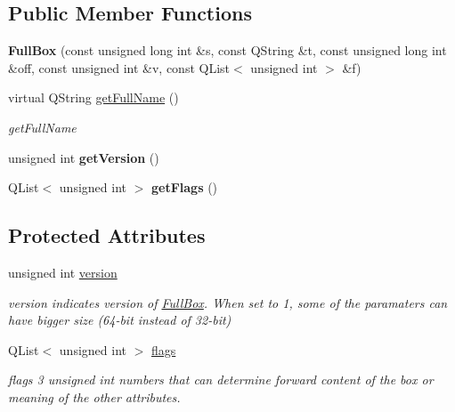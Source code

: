 \subsection*{Public Member Functions}
\begin{DoxyCompactItemize}
\item 
\hypertarget{class_full_box_a1dd227d6afcfddbd4bc5c4018e339858}{{\bfseries Full\-Box} (const unsigned long int \&s, const Q\-String \&t, const unsigned long int \&off, const unsigned int \&v, const Q\-List$<$ unsigned int $>$ \&f)}\label{class_full_box_a1dd227d6afcfddbd4bc5c4018e339858}

\item 
virtual Q\-String \hyperlink{class_full_box_a0701464d8e7386653f025833308f76ee}{get\-Full\-Name} ()
\begin{DoxyCompactList}\small\item\em get\-Full\-Name \end{DoxyCompactList}\item 
\hypertarget{class_full_box_afc93cc08ed7bc9b30ed219fd9b29d8a6}{unsigned int {\bfseries get\-Version} ()}\label{class_full_box_afc93cc08ed7bc9b30ed219fd9b29d8a6}

\item 
\hypertarget{class_full_box_a3569e34dffcdf998407fc2a77e5beb63}{Q\-List$<$ unsigned int $>$ {\bfseries get\-Flags} ()}\label{class_full_box_a3569e34dffcdf998407fc2a77e5beb63}

\end{DoxyCompactItemize}
\subsection*{Protected Attributes}
\begin{DoxyCompactItemize}
\item 
\hypertarget{class_full_box_a1fcf373fb0a760b702c02c20c18bb089}{unsigned int \hyperlink{class_full_box_a1fcf373fb0a760b702c02c20c18bb089}{version}}\label{class_full_box_a1fcf373fb0a760b702c02c20c18bb089}

\begin{DoxyCompactList}\small\item\em version indicates version of \hyperlink{class_full_box}{Full\-Box}. When set to 1, some of the paramaters can have bigger size (64-\/bit instead of 32-\/bit) \end{DoxyCompactList}\item 
\hypertarget{class_full_box_a3bfedd3ddb29af4762e0ef40c4c6830b}{Q\-List$<$ unsigned int $>$ \hyperlink{class_full_box_a3bfedd3ddb29af4762e0ef40c4c6830b}{flags}}\label{class_full_box_a3bfedd3ddb29af4762e0ef40c4c6830b}

\begin{DoxyCompactList}\small\item\em flags 3 unsigned int numbers that can determine forward content of the box or meaning of the other attributes. \end{DoxyCompactList}\end{DoxyCompactItemize}


